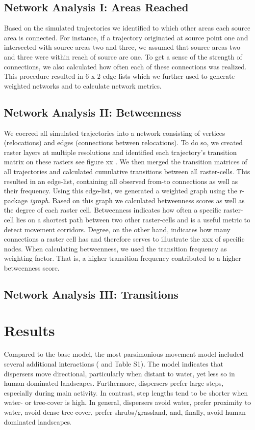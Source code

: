\documentclass[abstract=on,10pt,a4paper,bibliography=totocnumbered]{article}
\begin{document}
\subsection{Network Analysis I: Areas Reached}
Based on the simulated trajectories we identified to which other areas each
source area is connected. For instance, if a trajectory originated at source
point one and intersected with source areas two and three, we assumed that
source areas two and three were within reach of source are one. To get a sense
of the strength of connections, we also calculated how often each of these
connections was realized. This procedure resulted in 6 x 2 edge lists which we
further used to generate weighted networks and to calculate network metrics.

\subsection{Network Analysis II: Betweenness}
We coerced all simulated trajectories into a network consisting of vertices
(relocations) and edges (connections between relocations). To do so, we created
raster layers at multiple resolutions and identified each trajectory's
transition matrix on these rasters see figure xx \citep{Bastille.2018}. We then
merged the transition matrices of all trajectories and calculated cumulative
transitions between all raster-cells. This resulted in an edge-list, containing
all observed from-to connections as well as their frequency. Using this
edge-list, we generated a weighted graph using the r-package \textit{igraph}.
Based on this graph we calculated betweenness scores as well as the degree of
each raster cell. Betweenness indicates how often a specific raster-cell lies on
a shortest path between two other raster-cells and is a useful metric to detect
movement corridors. Degree, on the other hand, indicates how many connections a
raster cell has and therefore serves to illustrate the xxx of specific nodes.
When calculating betweenness, we used the transition frequency as weighting
factor. That is, a higher transition frequency contributed to a higher
betweenness score.

\subsection{Network Analysis III: Transitions}



\section{Results}
Compared to the base model, the most parsimonious movement model included
several additional interactions ( and Table S1). The model
indicates that dispersers move directional, particularly when distant to water,
yet less so in human dominated landscapes. Furthermore, dispersers prefer large
steps, especially during main activity. In contrast, step lengths tend to be
shorter when water- or tree-cover is high. In general, dispersers avoid water,
prefer proximity to water, avoid dense tree-cover, prefer shrubs/grassland, and,
finally, avoid human dominated landscapes.
\end{document}
